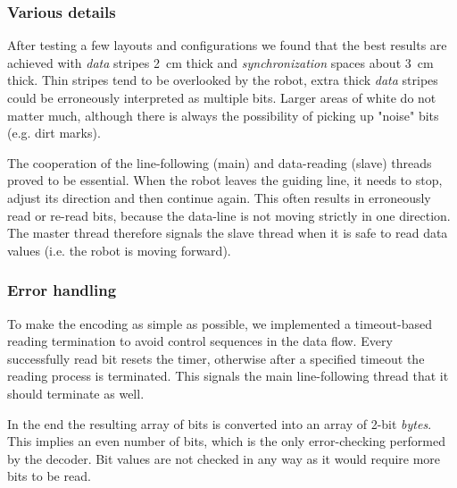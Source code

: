 \subsubsection{Various details}
After testing a few layouts and configurations we found that the best
results are achieved with \textit{data} stripes 2~cm thick and
\textit{synchronization} spaces about 3~cm thick. Thin stripes
tend to be overlooked by the robot, extra thick \textit{data} stripes
could be erroneously interpreted as multiple bits. Larger areas of white
do not matter much, although there is always the possibility of picking
up "noise" bits (e.g. dirt marks).

The cooperation of the line-following (main) and data-reading (slave) threads
proved to be essential. When the robot leaves the guiding line, it needs
to stop, adjust its direction and then continue again.
This often results in erroneously read or re-read bits, because the
data-line is not moving strictly in one direction. The master thread
therefore signals the slave thread when it is safe to read data values
(i.e. the robot is moving forward).

\subsubsection{Error handling}
To make the encoding as simple as possible, we implemented a
timeout-based reading termination to avoid control sequences in the data
flow. Every successfully read bit resets the timer, otherwise after
a specified timeout the reading process is terminated. This signals
the main line-following thread that it should terminate as well.

In the end the resulting array of bits is converted into an array of
2-bit \textit{bytes}. This implies an even number of bits, which is the
only error-checking performed by the decoder. Bit values are not checked
in any way as it would require more bits to be read.

